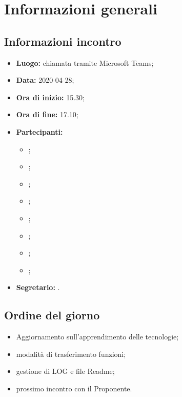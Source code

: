 \section{Informazioni generali}
\subsection{Informazioni incontro}
\begin{itemize}
	\item \textbf{Luogo:} chiamata tramite Microsoft Teams; 
	\item \textbf{Data:} 2020-04-28;
	\item \textbf{Ora di inizio:} 15.30; 
	\item \textbf{Ora di fine:} 17.10; 
	\item \textbf{Partecipanti:}
		\begin{itemize}
			\item \VB; 
			\item \LB; 
			\item \NF; 
			\item \EG; 
			\item \FJ; 
			\item \MP; 
			\item \AS; 
			\item \AZ; 
		\end{itemize}
	\item \textbf{Segretario:} \LB. 
\end{itemize}

\subsection{Ordine del giorno}
\begin{itemize}
	\item Aggiornamento sull'apprendimento delle tecnologie; 
	\item modalità di trasferimento funzioni; 
	\item gestione di LOG e file Readme; 
	\item prossimo incontro con il Proponente.
\end{itemize}
